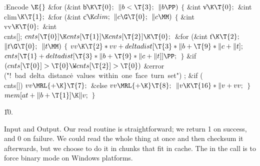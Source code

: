 \Y\B\4:Encode \X${}\E{}$\6
\&{for} (\&{int} \|b${}\K\T{0};{}$ ${}\|b<\T{3};{}$ ${}\|b\PP){}$\5
${}\{{}$\1\6
\&{int} \|v${}\K\T{0};{}$\6
\&{int} \\{clim}${}\K\T{1};{}$\7
\&{for} (\&{int} \|c${}\K\\{clim};{}$ ${}\|c\G\T{0};{}$ ${}\|c\MM){}$\5
${}\{{}$\1\6
\&{int} \\{vv}${}\K\T{0};{}$\6
\&{int} \\{cnts}[];\7
${}\\{cnts}[\T{0}]\K\\{cnts}[\T{1}]\K\\{cnts}[\T{2}]\K\T{0};{}$\6
\&{for} (\&{int} \|t${}\K\T{2};{}$ ${}\|t\G\T{0};{}$ ${}\|t\MM){}$\5
${}\{{}$\1\6
${}\\{vv}\K\T{2}*\\{vv}+\\{deltadist}[\T{3}*\|b+\T{9}*\|c+\|t];{}$\6
${}\\{cnts}[\T{1}+\\{deltadist}[\T{3}*\|b+\T{9}*\|c+\|t]]\PP;{}$\6
\4${}\}{}$\2\6
\&{if} ${}(\\{cnts}[\T{0}]>\T{0}\W\\{cnts}[\T{2}]>\T{0}){}$\1\6
\&{error} (\.{"!\ bad\ delta\ distanc}\)\.{e\ values\ within\ one\ }\)\.{face\
turn\ set"})\1\5
;\2\2\6
\&{if} (\\{cnts}[])\1\6
${}\\{vv}\MRL{+{\K}}\T{7};{}$\2\6
\&{else}\1\6
${}\\{vv}\MRL{+{\K}}\T{8};{}$\2\6
${}\|v\K\T{16}*\|v+\\{vv};{}$\6
\4${}\}{}$\2\6
${}\\{mem}[\\{at}+\|b+\T{1}]\K\|v;{}$\6
\4${}\}{}$\2\par
\U10.\fi

Input and Output.
Our read routine is straightforward; we return 1 on success, and
0 on failure.  We could read the whole thing at once and then checksum
it afterwards, but we choose to do it in chunks that fit in cache.
The \PB{\.{"rb"}} in the \PB{\\{fopen}} call is to force binary mode on Windows
platforms.

